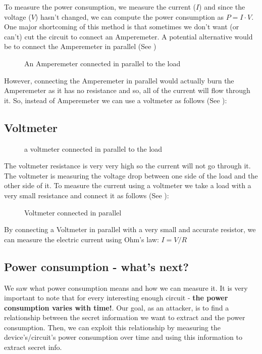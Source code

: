 To measure the power consumption, we measure the current ($I$) and since the voltage ($V$) 
hasn't changed, we can compute the power consumption as $P=I \cdot V$.
One major shortcoming of this method is that sometimes we don't want (or can't) 
cut the circuit to connect an Amperemeter. 
A potential alternative would be to connect the Amperemeter in parallel (See )

\begin{figure}[!ht]
    \centering
    
    \caption{An Amperemeter connected in parallel to the load} \label{fig:circuit6}
\end{figure}

However, connecting the Amperemeter in parallel would actually burn the Amperemeter as it has no
resistance and so, all of the current will flow through it. So, instead of
Amperemeter we can use a voltmeter as follows (See ):

\subsection{Voltmeter}

\begin{figure}[!ht]
    \centering
    
    \caption{a voltmeter connected in parallel to the load} \label{fig:circuit7}
\end{figure}

The voltmeter resistance is very very high so the current will not go through
it. The voltmeter is measuring the voltage drop between one side of the load and
the other side of it. To measure the current using a voltmeter we
take a load with a very small resistance and connect it as follows (See
):

\begin{figure}[!ht]
    \centering
    
    \caption{Voltmeter connected in parallel} \label{fig:circuit8}
\end{figure}

By connecting a Voltmeter in parallel with a very small and accurate resistor, we can measure the electric current
using Ohm's law: $I=V/R$
 
\subsection{Power consumption - what's next?}
We saw what power consumption means and how we can measure it. It is very important to
note that for every interesting enough circuit - \textbf{the power consumption varies with time!}. 
Our goal, as an attacker, is to find a relationship between the secret information we want to extract and the
power consumption. Then, we can exploit this relationship by measuring the device's/circuit's power consumption 
over time and using this information to extract secret info.

